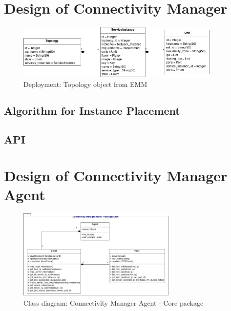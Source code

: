 \section{Design of Connectivity Manager}


\begin{figure}[H]
\centering

\includegraphics[width=0.9\textwidth]{images/design/cm_topology_object}

\caption{Deployment: Topology object from EMM}
\end{figure}


\subsection{Algorithm for Instance Placement}

\subsection{API}

\newpage
\section{Design of Connectivity Manager Agent}

\begin{figure}[H]
\centering

\includegraphics[width=0.7\textwidth]{images/design/cm_agent_class_diagram}

\caption{Class diagram: Connectivity Manager Agent - Core package}
\end{figure}


